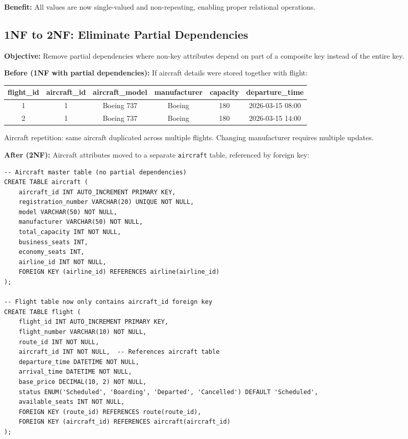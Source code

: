 \documentclass[12pt, a4paper]{article}
\begin{document}
\textbf{Benefit:} All values are now single-valued and non-repeating, enabling proper relational operations.

\subsection{1NF to 2NF: Eliminate Partial Dependencies}

\textbf{Objective:} Remove partial dependencies where non-key attributes depend on part of a composite key instead of the entire key.

\textbf{Before (1NF with partial dependencies):} If aircraft details were stored together with flight:
\begin{center}
\small
\begin{tabular}{|c|c|c|c|c|c|}
\hline
\textbf{flight\_id} & \textbf{aircraft\_id} & \textbf{aircraft\_model} & \textbf{manufacturer} & \textbf{capacity} & \textbf{departure\_time} \\
\hline
1 & 1 & Boeing 737 & Boeing & 180 & 2026-03-15 08:00 \\
\hline
2 & 1 & Boeing 737 & Boeing & 180 & 2026-03-15 14:00 \\
\hline
\end{tabular}
\end{center}

Aircraft repetition: same aircraft duplicated across multiple flights. Changing manufacturer requires multiple updates.

\textbf{After (2NF):} Aircraft attributes moved to a separate \texttt{aircraft} table, referenced by foreign key:

\begin{lstlisting}[style=sqlstyle]
-- Aircraft master table (no partial dependencies)
CREATE TABLE aircraft (
    aircraft_id INT AUTO_INCREMENT PRIMARY KEY,
    registration_number VARCHAR(20) UNIQUE NOT NULL,
    model VARCHAR(50) NOT NULL,
    manufacturer VARCHAR(50) NOT NULL,
    total_capacity INT NOT NULL,
    business_seats INT,
    economy_seats INT,
    airline_id INT NOT NULL,
    FOREIGN KEY (airline_id) REFERENCES airline(airline_id)
);

-- Flight table now only contains aircraft_id foreign key
CREATE TABLE flight (
    flight_id INT AUTO_INCREMENT PRIMARY KEY,
    flight_number VARCHAR(10) NOT NULL,
    route_id INT NOT NULL,
    aircraft_id INT NOT NULL,  -- References aircraft table
    departure_time DATETIME NOT NULL,
    arrival_time DATETIME NOT NULL,
    base_price DECIMAL(10, 2) NOT NULL,
    status ENUM('Scheduled', 'Boarding', 'Departed', 'Cancelled') DEFAULT 'Scheduled',
    available_seats INT NOT NULL,
    FOREIGN KEY (route_id) REFERENCES route(route_id),
    FOREIGN KEY (aircraft_id) REFERENCES aircraft(aircraft_id)
);
\end{lstlisting}
\end{document}
